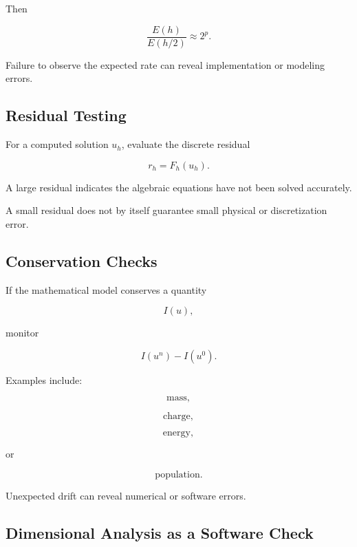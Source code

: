 Then

\[
\boxed{
\frac{
E(h)
}{
E(h/2)
}
\approx
2^p.
}
\]

Failure to observe the expected rate can reveal implementation or modeling
errors.

\subsection{Residual Testing}
\label{subsec:scientific-residual-testing}

For a computed solution \(u_h\), evaluate the discrete residual

\[
\boxed{
r_h
=
F_h(u_h).
}
\]

A large residual indicates the algebraic equations have not been solved
accurately.

A small residual does not by itself guarantee small physical or
discretization error.

\subsection{Conservation Checks}
\label{subsec:scientific-conservation-checks}

If the mathematical model conserves a quantity

\[
I(u),
\]

monitor

\[
\boxed{
I(u^n)-I(u^0).
}
\]

Examples include:

\[
\boxed{
\text{mass},
}
\]

\[
\boxed{
\text{charge},
}
\]

\[
\boxed{
\text{energy},
}
\]

or

\[
\boxed{
\text{population}.
}
\]

Unexpected drift can reveal numerical or software errors.

\subsection{Dimensional Analysis as a Software Check}
\label{subsec:dimensional-analysis-software-check}

